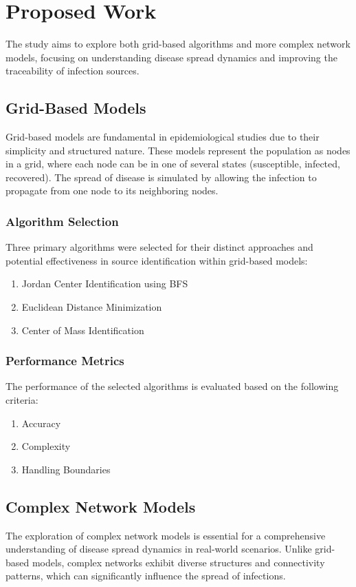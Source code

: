 \chapter{Proposed Work}

The study aims to explore both grid-based algorithms and more complex network models, focusing on understanding disease spread dynamics and improving the traceability of infection sources.

\section{Grid-Based Models}
Grid-based models are fundamental in epidemiological studies due to their simplicity and structured nature. These models represent the population as nodes in a grid, where each node can be in one of several states (susceptible, infected, recovered). The spread of disease is simulated by allowing the infection to propagate from one node to its neighboring nodes.

\subsection{Algorithm Selection}
Three primary algorithms were selected for their distinct approaches and potential effectiveness in source identification within grid-based models:

\begin{enumerate}
    \item Jordan Center Identification using BFS
    \item Euclidean Distance Minimization
    \item Center of Mass Identification
\end{enumerate}

\subsection{Performance Metrics}
The performance of the selected algorithms is evaluated based on the following criteria:
\begin{enumerate}
    \item Accuracy
    \item Complexity
    \item Handling Boundaries
\end{enumerate}

\section{Complex Network Models}
The exploration of complex network models is essential for a comprehensive understanding of disease spread dynamics in real-world scenarios. Unlike grid-based models, complex networks exhibit diverse structures and connectivity patterns, which can significantly influence the spread of infections.

